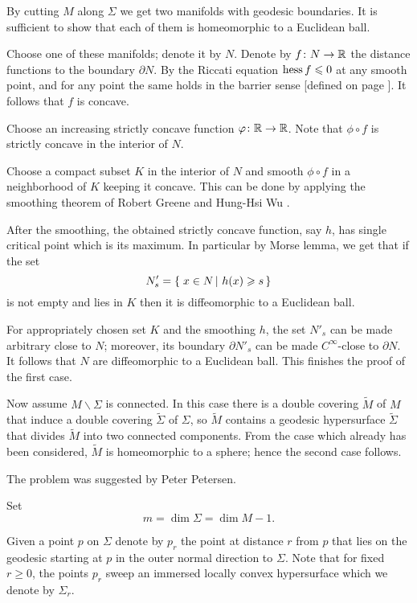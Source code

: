 By cutting $M$ along $\Sigma$ 
we get two manifolds
with geodesic boundaries.
It is sufficient to show that each of them is homeomorphic to a Euclidean ball.

Choose one of these manifolds; denote it by $N$.
Denote by $f\:N\z\to\RR$ the distance functions to the boundary $\partial N$.
By the Riccati equation $\operatorname{\rm hess}\nolimits f\leqslant 0$ at any smooth point,
and for any point the same holds in the barrier sense [defined on page \pageref{page:barrier sense}].
It follows that $f$ is concave.

Choose an increasing strictly concave function $\varphi\colon\mathbb{R}\to\mathbb{R}$.
Note that $\phi\circ f$ is strictly concave in the interior of $N$.

Choose a compact subset $K$ in the interior of $N$ and
smooth $\phi\circ f$ in a neighborhood of $K$ keeping it concave. 
This can be done by applying the smoothing theorem of Robert Greene and Hung-Hsi Wu \cite[Theorem~2]{greene-wu}.

After the smoothing, the obtained strictly concave function, say $h$, has single critical point which is its maximum.
In particular by Morse lemma, we get that if the set  
\[N'_s=\set{x\in N}{h(x)\ge s}\]
is not empty and lies in $K$ then it is diffeomorphic to a Euclidean ball.

For appropriately chosen set $K$ and the smoothing $h$, the set $N'_s$ can be made arbitrary close to $N$;
moreover, its boundary $\partial N'_s$ can be made $C^\infty$-close to $\partial N$.
It follows that $N$ are diffeomorphic to a Euclidean ball.
This finishes the proof of the first case.

Now assume $M\backslash\Sigma$ is connected.
In this case there is a double covering $\tilde M$ of $M$ that induce a double covering $\tilde\Sigma$ of $\Sigma$,
so $\tilde M$ contains a geodesic hypersurface $\tilde\Sigma$ that divides $\tilde M$ into two connected components. 
From the case which already has been considered, $\tilde M$ is homeomorphic to a sphere;
hence the second case follows.
\qeds

The problem was suggested by Peter Petersen.



Set 
\[m=\dim \Sigma=\dim M-1.\]

Given a point $p$ on $\Sigma$ 
denote by $p_r$ the point at distance $r$ from $p$
that lies on the geodesic starting at $p$ in the outer normal direction to $\Sigma$.
Note that for fixed $r\ge 0$,
the points $p_r$ sweep an immersed locally convex hypersurface which we denote by $\Sigma_r$.

